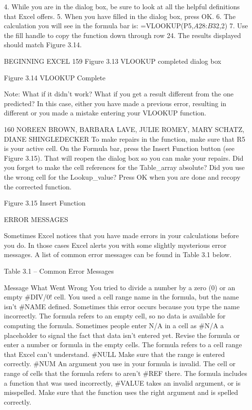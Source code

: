 4.   While you are in the dialog box, be sure to look at all the helpful definitions that Excel offers.
5.   When you have filled in the dialog box, press OK.
6.   The calculation you will see in the formula bar is: =VLOOKUP(P5,$A$28:$B$32,2)
7.   Use the fill handle to copy the function down through row 24. The results displayed should
match Figure 3.14.




BEGINNING EXCEL 159
Figure 3.13 VLOOKUP completed dialog box




Figure 3.14 VLOOKUP Complete


Note: What if it didn’t work? What if you get a result different from the one predicted? In this case,
either you have made a previous error, resulting in different %
or you made a mistake entering your VLOOKUP function.


160 NOREEN BROWN, BARBARA LAVE, JULIE ROMEY, MARY SCHATZ, DIANE SHINGLEDECKER
To make repairs in the function, make sure that R5 is your active cell. On the Formula bar, press
the Insert Function button (see Figure 3.15). That will reopen the dialog box so you can make your
repairs. Did you forget to make the cell references for the Table_array absolute? Did you use the
wrong cell for the Lookup_value? Press OK when you are done and recopy the corrected function.




Figure 3.15 Insert Function


ERROR MESSAGES

Sometimes Excel notices that you have made errors in your calculations before you do. In those cases
Excel alerts you with some slightly mysterious error messages. A list of common error messages can
be found in Table 3.1 below.

Table 3.1 – Common Error Messages

Message What Went Wrong
You tried to divide a number by a zero (0) or an empty
#DIV/0!
cell.
You used a cell range name in the formula, but the name isn’t
#NAME      defined. Sometimes this error occurs because you type the name
incorrectly.
The formula refers to an empty cell, so no data is available
for computing the formula. Sometimes people enter N/A in a cell as
#N/A       a placeholder to signal the fact that data isn’t entered yet.
Revise the formula or enter a number or formula in the empty
cells.
The formula refers to a cell range that Excel can’t understand.
#NULL
Make sure that the range is entered correctly.
#NUM       An argument you use in your formula is invalid.
The cell or range of cells that the formula refers to aren’t
#REF
there.
The formula includes a function that was used incorrectly,
#VALUE     takes an invalid argument, or is misspelled. Make sure that the
function uses the right argument and is spelled correctly.



